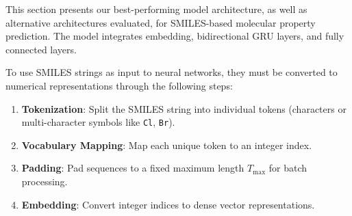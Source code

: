 \documentclass[11pt,a4paper]{article}
\begin{document}
This section presents our best-performing model architecture, as well as alternative architectures evaluated, for SMILES-based molecular property prediction. The model integrates embedding, bidirectional GRU layers, and fully connected layers.

To use SMILES strings as input to neural networks, they must be converted to numerical representations through the following steps:

\begin{enumerate}
    \item \textbf{Tokenization}: Split the SMILES string into individual tokens (characters or multi-character symbols like \texttt{Cl}, \texttt{Br}).
    \item \textbf{Vocabulary Mapping}: Map each unique token to an integer index.
    \item \textbf{Padding}: Pad sequences to a fixed maximum length $T_{\max}$ for batch processing.
    \item \textbf{Embedding}: Convert integer indices to dense vector representations.
\end{enumerate}
\end{document}
